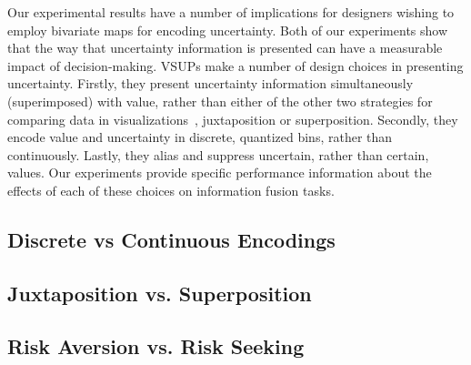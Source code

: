 Our experimental results have a number of implications for designers wishing to employ bivariate maps for encoding uncertainty. Both of our experiments show that the way that uncertainty information is presented can have a measurable impact of decision-making. VSUPs make a number of design choices in presenting uncertainty. Firstly, they present uncertainty information simultaneously (superimposed) with value, rather than either of the other two strategies for comparing data in visualizations~\cite{gleicher2011visual}, juxtaposition or superposition. Secondly, they encode value and uncertainty in discrete, quantized bins, rather than continuously. Lastly, they alias and suppress uncertain, rather than certain, values. Our experiments provide specific performance information about the effects of each of these choices on information fusion tasks.

\subsection{Discrete vs Continuous Encodings}

\subsection{Juxtaposition vs. Superposition}

\subsection{Risk Aversion vs. Risk Seeking}







